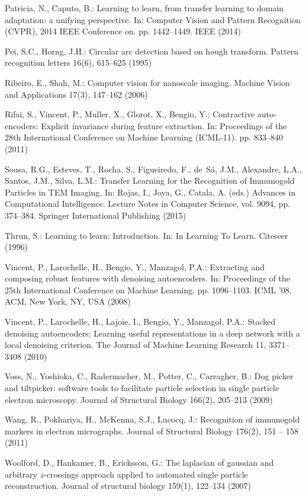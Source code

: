 \documentclass[a4paper,11pt]{article}
\newcommand{\1}{\mathbbm{1}}
\theoremstyle{plain}
\begin{document}
\begin{thebibliography}{10}
Patricia, N., Caputo, B.: Learning to learn, from transfer learning to domain
  adaptation: a unifying perspective. In: Computer Vision and Pattern
  Recognition (CVPR), 2014 IEEE Conference on. pp. 1442--1449. IEEE (2014)

Pei, S.C., Horng, J.H.: Circular arc detection based on hough transform.
  Pattern recognition letters  16(6),  615--625 (1995)

Ribeiro, E., Shah, M.: Computer vision for nanoscale imaging. Machine Vision
  and Applications  17(3),  147--162 (2006)

Rifai, S., Vincent, P., Muller, X., Glorot, X., Bengio, Y.: Contractive
  auto-encoders: Explicit invariance during feature extraction. In: Proceedings
  of the 28th International Conference on Machine Learning (ICML-11). pp.
  833--840 (2011)

Sousa, R.G., Esteves, T., Rocha, S., Figueiredo, F., de~S{\'a}, J.M.,
  Alexandre, L.A., Santos, J.M., Silva, L.M.: {Transfer Learning for the
  Recognition of Immunogold Particles in TEM Imaging}. In: Rojas, I., Joya, G.,
  Catala, A. (eds.) Advances in Computational Intelligence. Lecture Notes in
  Computer Science, vol. 9094, pp. 374--384. Springer International Publishing
  (2015)

Thrun, S.: Learning to learn: Introduction. In: In Learning To Learn. Citeseer
  (1996)

Vincent, P., Larochelle, H., Bengio, Y., Manzagol, P.A.: Extracting and
  composing robust features with denoising autoencoders. In: Proceedings of the
  25th International Conference on Machine Learning. pp. 1096--1103. ICML '08,
  ACM, New York, NY, USA (2008)

Vincent, P., Larochelle, H., Lajoie, I., Bengio, Y., Manzagol, P.A.: Stacked
  denoising autoencoders: Learning useful representations in a deep network
  with a local denoising criterion. The Journal of Machine Learning Research
  11,  3371--3408 (2010)

Voss, N., Yoshioka, C., Radermacher, M., Potter, C., Carragher, B.: Dog picker
  and tiltpicker: software tools to facilitate particle selection in single
  particle electron microscopy. {Journal of Structural Biology}  166(2),
  205--213 (2009)

Wang, R., Pokhariya, H., McKenna, S.J., Lucocq, J.: Recognition of immunogold
  markers in electron micrographs. Journal of Structural Biology  176(2),  151
  -- 158 (2011)

Woolford, D., Hankamer, B., Ericksson, G.: The laplacian of gaussian and
  arbitrary $z$-crossings approach applied to automated single particle
  reconstruction. Journal of structural biology  159(1),  122--134 (2007)

\end{thebibliography}
\end{document}

